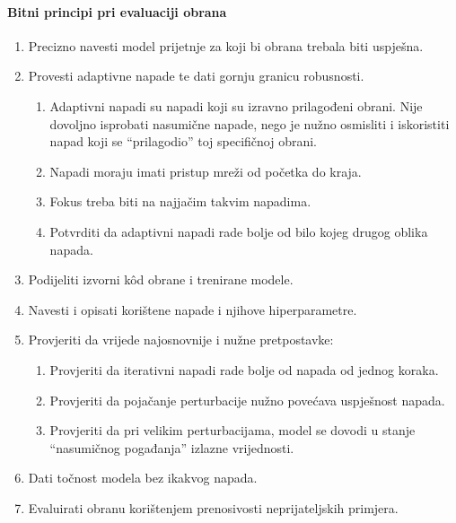 \documentclass[utf8, diplomski]{fer}
\begin{document}
\paragraph{Bitni principi pri evaluaciji obrana}
\begin{enumerate}[noitemsep,topsep=0pt,parsep=0pt,partopsep=0pt]
	\item Precizno navesti model prijetnje za koji bi obrana trebala biti uspješna.
    \item Provesti adaptivne napade te dati gornju granicu robusnosti.
    \begin{enumerate}[noitemsep,topsep=0pt,parsep=0pt,partopsep=0pt]
    	\item Adaptivni napadi su napadi koji su izravno prilagođeni obrani. Nije dovoljno isprobati nasumične napade, nego je nužno osmisliti i iskoristiti napad koji se ``prilagodio'' toj specifičnoj obrani.
        \item Napadi moraju imati pristup mreži od početka do kraja.
        \item Fokus treba biti na najjačim takvim napadima.
        \item Potvrditi da adaptivni napadi rade bolje od bilo kojeg drugog oblika napada.
    \end{enumerate}
    \item Podijeliti izvorni kôd obrane i trenirane modele.
    \item Navesti i opisati korištene napade i njihove hiperparametre.
    \item Provjeriti da vrijede najosnovnije i nužne pretpostavke:
    \begin{enumerate}[noitemsep,topsep=0pt,parsep=0pt,partopsep=0pt]
    	\item Provjeriti da iterativni napadi rade bolje od napada od jednog koraka.
        \item Provjeriti da pojačanje perturbacije nužno povećava uspješnost napada.
        \item Provjeriti da pri velikim perturbacijama, model se dovodi u stanje ``nasumičnog pogađanja'' izlazne vrijednosti.
    \end{enumerate}
    \item Dati točnost modela bez ikakvog napada.
    \item Evaluirati obranu korištenjem prenosivosti neprijateljskih primjera.
\end{enumerate}
\end{document}
